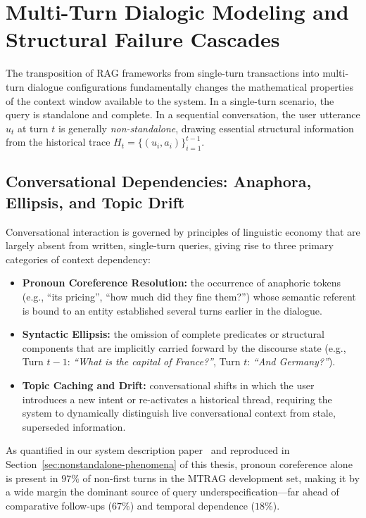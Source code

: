 \section{Multi-Turn Dialogic Modeling and Structural Failure Cascades}
\label{sec:multiturn}

The transposition of RAG frameworks from single-turn transactions into multi-turn dialogue configurations fundamentally changes the mathematical properties of the context window available to the system. In a single-turn scenario, the query is standalone and complete. In a sequential conversation, the user utterance $u_t$ at turn $t$ is generally \textit{non-standalone}, drawing essential structural information from the historical trace $H_t = \{(u_i, a_i)\}_{i=1}^{t-1}$.

\subsection{Conversational Dependencies: Anaphora, Ellipsis, and Topic Drift}

Conversational interaction is governed by principles of linguistic economy that are largely absent from written, single-turn queries, giving rise to three primary categories of context dependency:
\begin{itemize}
    \item \textbf{Pronoun Coreference Resolution:} the occurrence of anaphoric tokens (e.g., ``its pricing'', ``how much did they fine them?'') whose semantic referent is bound to an entity established several turns earlier in the dialogue.
    \item \textbf{Syntactic Ellipsis:} the omission of complete predicates or structural components that are implicitly carried forward by the discourse state (e.g., Turn $t{-}1$: \textit{``What is the capital of France?''}, Turn $t$: \textit{``And Germany?''}).
    \item \textbf{Topic Caching and Drift:} conversational shifts in which the user introduces a new intent or re-activates a historical thread, requiring the system to dynamically distinguish live conversational context from stale, superseded information.
\end{itemize}
As quantified in our system description paper~\citep{athanasiou2026ailsntua} and reproduced in Section~\ref{sec:nonstandalone-phenomena} of this thesis, pronoun coreference alone is present in $97\%$ of non-first turns in the MTRAG development set, making it by a wide margin the dominant source of query underspecification---far ahead of comparative follow-ups ($67\%$) and temporal dependence ($18\%$).

